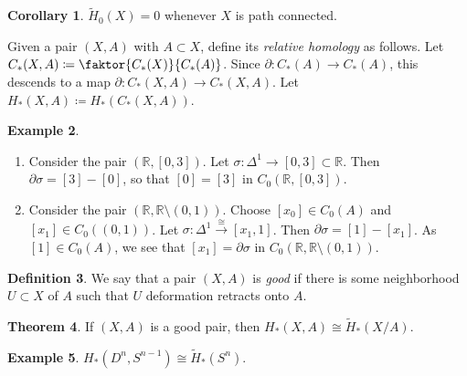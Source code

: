 \documentclass[10pt,letterpaper,cm]{nupset}
\theoremstyle{definition}
\newtheorem{definition}{Definition}[subsection]
\newtheorem{exmp}[definition]{Example}
\theoremstyle{theorem}
\newtheorem{theorem}[definition]{Theorem}
\newtheorem{corollary}[definition]{Corollary}
\theoremstyle{remark}
\newcommand{\R}{\mathbb{R}}
\newcommand{\1}{\mathbb{1}}
\newcommand{\0}{\vec 0}
\begin{document}
\begin{corollary}\label{c10}
$\widetilde{H}_0(X)=0$ whenever $X$ is path connected. 
\end{corollary}


Given a pair $(X,A)$ with $A\subset X$, define its \textit{relative homology} as follows. Let $C_{\ast}(X,A) \coloneqq \faktor{C_{\ast}(X)}{C_{\ast}(A)}$. Since $\partial : C_{\ast}(A) \to C_{\ast}(A)$, this descends to a map $\partial : C_{\ast}(X,A) \to C_{\ast}(X,A)$. Let $ H_{\ast}(X,A) \coloneqq H_{\ast}(C_{\ast}(X,A))   .$

\begin{exmp} $ $
\begin{enumerate}
\item Consider the pair $\left(\R, \left[0,3\right]\right)$. Let $\sigma : \Delta^1 \to [0,3]\subset \R$. Then $\partial{\sigma} = [3] -[0]$, so that $[0] = [3]$ in $C_0(\R, [0,3])$.
\item Consider the pair $\left(\R, \R \setminus (0,1)\right)$. Choose $[x_0] \in C_0(A)$ and $[x_1] \in C_0((0,1))$. Let $\sigma : \Delta^1 \overset{\cong}{\longrightarrow} \left[x_1, 1\right]$. Then $\partial{\sigma} = [1] -[x_1]$. As $[1]\in C_0(A)$, we see that $[x_1] = \partial{\sigma}$ in $C_0(\R, \R\setminus (0,1))$.
\end{enumerate}
\end{exmp}

\begin{definition}
We say that a pair $(X, A)$ is \textit{good} if there is some neighborhood $U\subset X$ of $A$ such that $U$ deformation retracts onto $A$.
\end{definition}

\begin{theorem}
If $(X,A)$ is a good pair, then $H_{\ast}(X,A) \cong \widetilde{H}_{\ast}(X/A)$.
\end{theorem}

\begin{exmp}
$H_{\ast}(D^n, S^{n-1}) \cong \widetilde{H}_{\ast}(S^n)$.
\end{exmp}
\end{document}
